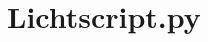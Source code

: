 \documentclass[dutch,dit,thesis]{hogentreport}
\begin{document}


%
\newpage
\chapter{Lichtscript.py} 
\label{script}
\inputminted{Python}{../scripts/lichtscript.py}


\backmatter{}

\setlength\bibitemsep{2pt} %
\printbibliography[heading=bibintoc]
\end{document}
